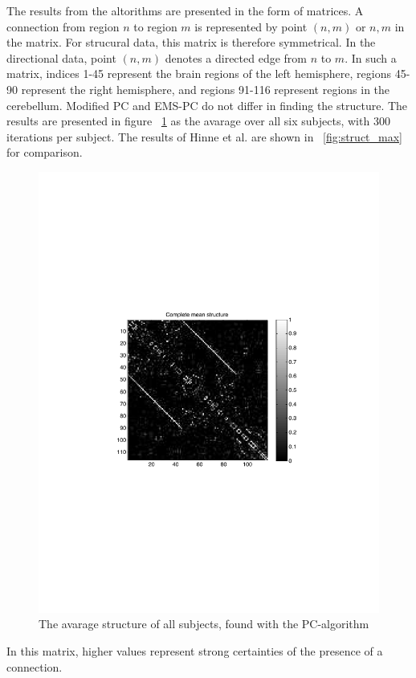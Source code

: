 \documentclass[a4paper, 10pt, english, onecolumn]{article}
\begin{document}
The results from the altorithms are presented in the form of matrices.
A connection from region $n$ to region $m$ is represented by point $(n,m)$ or $n,m$ in the matrix.
For strucural data, this matrix is therefore symmetrical.
In the directional data, point $(n,m)$ denotes a directed edge from $n$ to $m$.
In such a matrix, indices 1-45 represent the brain regions of the left hemisphere, regions 45-90 represent the right hemisphere, and regions 91-116 represent regions in the cerebellum. %
Modified PC and EMS-PC do not differ in finding the structure.
The results are presented in figure ~\ref{fig:struct_avg} as the avarage over all six subjects, with 300 iterations per subject.
The results of Hinne et al. are shown in ~\ref{fig:struct_max} for comparison.

\begin{figure}[h!]
  \centering
  \includegraphics{images/struct_full_mean_gray}
  \caption{The avarage structure of all subjects, found with the PC-algorithm}
  \label{fig:struct_avg}
\end{figure}
In this matrix, higher values represent strong certainties of the presence of a connection.
\end{document}
